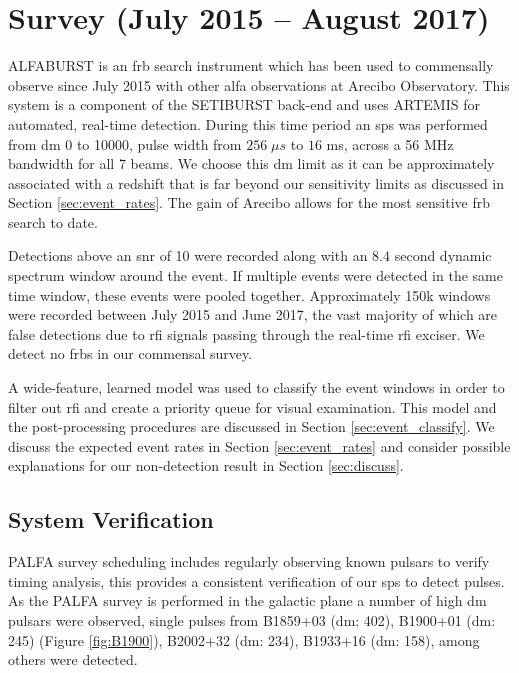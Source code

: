 \documentclass[a4paper,fleqn,usenatbib]{mnras}
\begin{document}
\section{Survey (July 2015 -- August 2017)}
\label{sec:overview}

ALFABURST is an \gls{frb} search instrument which has been used to commensally
observe since July 2015 with other \gls{alfa} observations at Arecibo
Observatory. This system is a component of the SETIBURST back-end
\citep{2017ApJS..228...21C} and uses ARTEMIS \citep{2015MNRAS.452.1254K} for
automated, real-time detection. During this time period an \gls{sps} was
performed from \gls{dm} 0 to 10000, pulse width from $256 \; \mu s$ to $16$ ms,
across a 56 MHz bandwidth for all 7 beams. We choose this \gls{dm} limit as it
can be approximately associated with a redshift that is far beyond our
sensitivity limits as discussed in Section \ref{sec:event_rates}. The gain of
Arecibo allows for the most sensitive \gls{frb} search to date.

Detections above an \gls{snr} of 10 were recorded along with an $8.4$ second
dynamic spectrum window around the event. If multiple events were detected in
the same time window, these events were pooled together.  Approximately 150k
windows were recorded between July 2015 and June 2017, the vast majority of
which are false detections due to \gls{rfi} signals passing through the
real-time \gls{rfi} exciser. We detect no \glspl{frb} in our commensal survey.

A wide-feature, learned model was used to classify the event windows in order to
filter out \gls{rfi} and create a priority queue for visual examination. This
model and the post-processing procedures are discussed in Section
\ref{sec:event_classify}. We discuss the expected event rates in Section
\ref{sec:event_rates} and consider possible explanations for our non-detection
result in Section \ref{sec:discuss}.


\subsection{System Verification}
\label{sec:system_verify}

PALFA survey scheduling includes regularly observing known pulsars to verify
timing analysis, this provides a consistent verification of our \gls*{sps} to
detect pulses. As the PALFA survey is performed in the galactic plane a number
of high \gls*{dm} pulsars were observed, single pulses from B1859+03 (\gls*{dm}:
402), B1900+01 (\gls*{dm}: 245) (Figure \ref{fig:B1900}), B2002+32 (\gls*{dm}:
234), B1933+16 (\gls*{dm}: 158), among others were detected.
\end{document}

